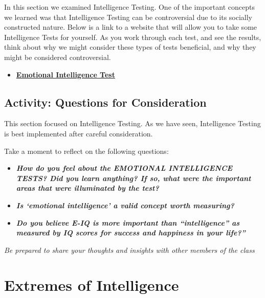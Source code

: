 \documentclass[
]{book}
\providecommand{\tightlist}{%
  \setlength{\itemsep}{0pt}\setlength{\parskip}{0pt}}
\begin{document}
\begin{reflect}
In this section we examined Intelligence Testing. One of the important concepts we learned was that Intelligence Testing can be controversial due to its socially constructed nature.
Below is a link to a website that will allow you to take some Intelligence Tests for yourself. As you work through each test, and see the results, think about why we might consider these types of tests beneficial, and why they might be considered controversial.

\begin{itemize}
\tightlist
\item
  \href{https://www.queendom.com/tests/}{\textbf{Emotional Intelligence Test}}
\end{itemize}
\end{reflect}

\hypertarget{activity-questions-for-consideration-3}{%
\subsection*{Activity: Questions for Consideration}\label{activity-questions-for-consideration-3}}

\begin{reflect}
This section focused on Intelligence Testing. As we have seen, Intelligence Testing is best implemented after careful consideration.

Take a moment to reflect on the following questions:

\begin{itemize}
\tightlist
\item
  \textbf{\emph{How do you feel about the EMOTIONAL INTELLIGENCE TESTS? Did you learn anything? If so, what were the important areas that were illuminated by the test?}}
\item
  \textbf{\emph{Is `emotional intelligence' a valid concept worth measuring?}}
\item
  \textbf{\emph{Do you believe E-IQ is more important than ``intelligence'' as measured by IQ scores for success and happiness in your life?''}}
\end{itemize}

\emph{Be prepared to share your thoughts and insights with other members of the class}
\end{reflect}

\hypertarget{extremes-of-intelligence}{%
\section{Extremes of Intelligence}\label{extremes-of-intelligence}}
\end{document}

